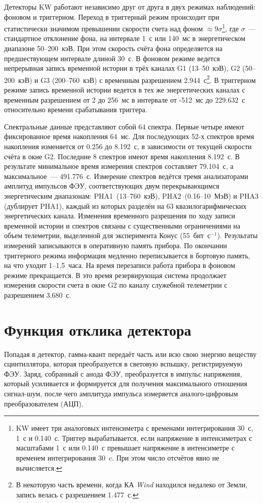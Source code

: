 Детекторы KW работают независимо друг от друга в двух режимах наблюдений: 
фоновом и триггерном. Переход в триггерный режим происходит при статистически 
значимом превышении скорости счета над фоном $\approx 9\sigma$\footnote{
KW имеет три аналоговых интенсиметра с временами интегрирования 30~с, 1~с и 0.140~с. 
Триггер вырабатывается, если напряжение в интенсиметрах с масштабами 1~с или 0.140~с 
превышает напряжение в интенсиметре с временем интегрирования 30~c. 
При этом число отсчётов явно не вычисляется.
}, 
где $\sigma$~--- стандартное отклонение фона, на интервале 1~с или 140~мс 
в энергетическом диапазоне 50--200~кэВ. При этом скорость счёта фона 
определяется на предшествующем интервале длиной 30~с. В фоновом режиме ведется 
непрерывная запись временной истории в трёх каналах G1 (13--50~кэВ), G2 (50--200~кэВ) 
и G3 (200--760~кэВ) с временным разрешением 2.944~с\footnote{
В некоторую часть времени, когда КА \textit{Wind} находился недалеко от Земли, 
запись велась с разрешением 1.477~с.
}. В триггерном режиме запись 
временной истории ведется в тех же энергетических каналах с временным разрешением 
от 2 до 256~мс в интервале от -512~мс до 229.632~с относительно времени срабатывания 
триггера.

Спектральные данные представляют собой 64 спектра. Первые четыре имеют фиксированное время накопления 64~мс.
Для последующих 52-х спектров время накопления изменяется от 0.256 до 8.192~с, 
в зависимости от текущей скорости счёта в окне G2. Последние 8 спектров имеют время накопления 8.192~с. 
В результате минимальное время измерения спектров составляет 79.104~с, а максимальное~--- 491.776~с.
Измерение спектров ведётся тремя анализаторами амплитуд импульсов ФЭУ, соответствующих
двум перекрывающимся энергетическим диапазонам:  
PHA1~(13--760~кэВ), PHA2~(0.16--10~МэВ) и PHA3 (дублирует PHA1), каждый из которых 
разделён на 63 квазилогарифмических энергетических канала. 
Изменения временного разрешения по ходу записи временной истории и спектров связаны 
с существенными ограничениями на объем телеметрии, 
выделенной для эксперимента Конус (55~бит~с$^{-1}$). Результаты измерений записываются в оперативную 
память прибора. По окончании триггерного режима информация медленно переписывается 
в бортовую память, на что уходит 1--1.5~часа. На время перезаписи работа прибора 
в фоновом режиме прекращается. В это время резервирующая система продолжает измерения
скорости счета в окне G2 по каналу служебной телеметрии с разрешением 3.680~с.

\section{Функция отклика детектора}
Попадая в детектор, гамма-квант передаёт часть или всю свою энергию веществу 
сцинтиллятора, которая преобразуется в световую вспышку, регистрируемую ФЭУ. 
Заряд, собранный с анода ФЭУ, преобразуется в импульс напряжения, который усиливается и формируется для получения 
максимального отношения сигнал-шум, после чего амплитуда импульса измеряется 
аналого-цифровым преобразователем (АЦП). 

